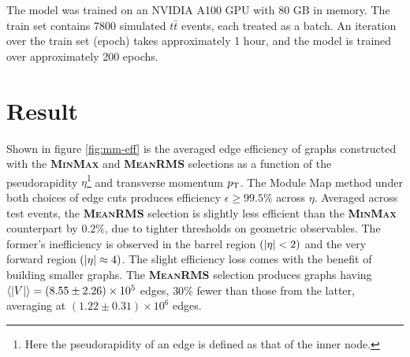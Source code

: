 \newpage


The model was trained on an NVIDIA A100 GPU with 80 GB in memory. 
The train set contains 7800 simulated $t\bar{t}$ events, each treated as a batch. 
An iteration over the train set (epoch) takes approximately 1 hour, and the model is trained over approximately 200 epochs. 

\section{Result}
\label{sect:graph-contruction-performance}

Shown in figure \ref{fig:mm-eff} is the averaged edge efficiency of graphs constructed with the \textbf{\textsc{MinMax}} and \textbf{\textsc{MeanRMS}} selections as a function of the pseudorapidity $\eta$\footnote{Here the pseudorapidity of an edge is defined as that of the inner node.} and transverse momentum $p_{\text{T}}$. 
The Module Map method under both choices of edge cuts produces efficiency $\epsilon\ge 99.5\%$ across $\eta$. 
Averaged across test events, the \textbf{\textsc{MeanRMS}} selection is slightly less efficient than the \textbf{\textsc{MinMax}} counterpart by $0.2\%$, due to tighter thresholds on geometric observables. 
The former's inefficiency is observed in the barrel region $(\abs{\eta}<2)$ and the very forward region $(\abs{\eta} \approx 4)$.
The slight efficiency loss comes with the benefit of building smaller graphs.
The \textbf{\textsc{MeanRMS}} selection produces graphs having $\expval{|V|} = (8.55\pm2.26)\times10^5$ edges, $30\%$ fewer than those from the latter, averaging at $(1.22\pm0.31)\times10^6$ edges.

